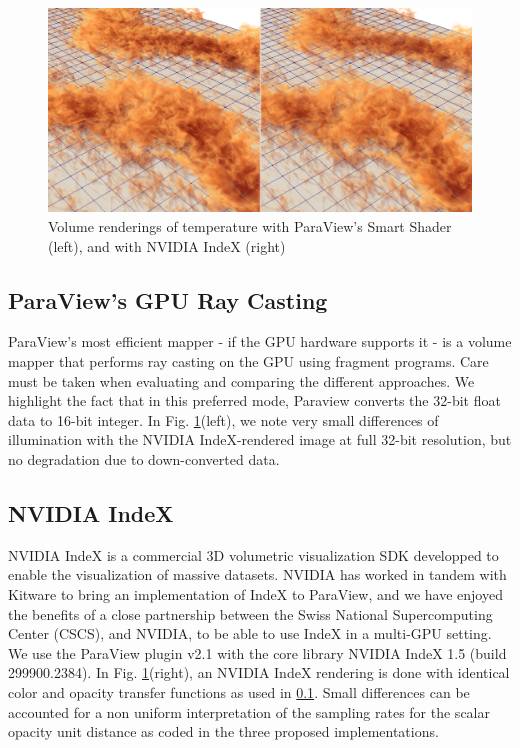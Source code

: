 \documentclass[final,5p,times,twocolumn]{elsarticle}
\begin{document}
\begin{figure}
	\centering
	\includegraphics[width=\linewidth]{fig2}%
	\caption{\label{fig:gpucloseup} Volume renderings of temperature with ParaView's
Smart Shader (left), and with NVIDIA IndeX (right)}
\end{figure}

\subsection{ParaView's GPU Ray Casting} \label{smart}

ParaView's most efficient mapper - if the GPU hardware supports it - is a volume
mapper that performs ray casting on the GPU using fragment programs. Care must
be taken when evaluating and comparing the different approaches. We highlight the
fact that in this preferred mode, Paraview converts the 32-bit float data to 16-bit
integer. In Fig. \ref{fig:gpucloseup}(left), we note very small differences of illumination with the
NVIDIA IndeX-rendered image at full 32-bit resolution,
but no degradation due to down-converted data.

\subsection{NVIDIA IndeX} \label{index}

NVIDIA IndeX\cite{NVIDIAIndeX} is a commercial 3D volumetric visualization SDK developped to enable
the visualization of massive datasets. NVIDIA has worked in tandem with Kitware to
bring an implementation of IndeX to ParaView, and we have enjoyed the benefits
of a close partnership between the Swiss National Supercomputing Center (CSCS),
and NVIDIA, to be able to use IndeX in a multi-GPU setting. We use the ParaView
plugin v2.1 with the core library NVIDIA IndeX 1.5 (build 299900.2384). In
Fig. \ref{fig:gpucloseup}(right), an NVIDIA IndeX rendering is done with identical
color and opacity transfer functions as used in \ref{smart}.
Small differences can be accounted for a non uniform interpretation of the sampling rates
for the scalar opacity unit distance as coded in the three proposed implementations.
\end{document}
